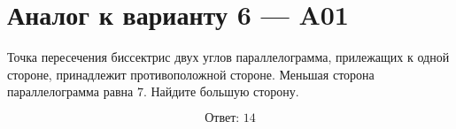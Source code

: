 


\section*{Аналог к варианту 6 — A01}
Точка пересечения биссектрис двух углов параллелограмма, прилежащих к одной стороне, принадлежит противоположной стороне. Меньшая сторона параллелограмма равна \(7\). Найдите большую сторону.
\begin{center}\figParallelogramTwoBisectors\end{center}
\[\boxed{\text{Ответ: }14}\]


